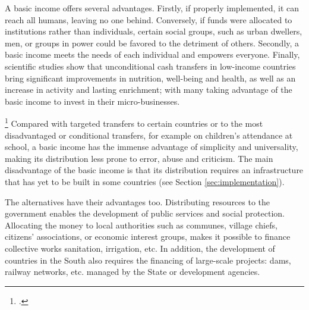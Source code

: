 \documentclass[a5paper,english,openany]{memoir}
\begin{document}
A basic %
income offers several advantages. Firstly, if properly implemented, it can reach all humans, leaving no one behind. Conversely, if funds were allocated to institutions rather than individuals, certain social groups, such as urban dwellers, men, or groups in power %
could be favored %
to the detriment of others. Secondly, %
a basic income meets the needs of each individual and empowers everyone. Finally, scientific studies show that unconditional cash transfers in low-income countries bring significant improvements in nutrition, well-being %
and health, as well as an increase in activity and lasting enrichment; with many taking advantage of the basic income to invest in their micro-businesses.  %

\footnote{\citet{egger_general_2022,haushofer_short-term_2016,standing_little_2014}.} 
Compared with targeted transfers to certain countries or to the most disadvantaged %
or conditional transfers, for example on children's attendance at school, %
a basic income has the immense advantage of simplicity and universality, making its distribution less prone to error, abuse %
and criticism. The main disadvantage of the basic income is that its distribution requires an infrastructure that has yet to be built in some countries (see Section \ref{sec:implementation}).  %

The alternatives have their advantages too. Distributing resources to the government enables the development of public services and social protection. Allocating the money to local authorities such as communes, village chiefs, citizens' associations, or economic interest groups,  %
makes it possible to finance collective works sanitation, irrigation, etc. %
In addition, the development of countries in the South also requires the financing of large-scale projects: dams, railway networks, etc. %
managed by the State or development agencies. 
\end{document}
